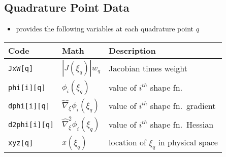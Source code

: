 \subsection*{\libMesh{} Quadrature Point Data}
\begin{frame}[t]
	\begin{block}{}
	\begin{itemize}    
	\item{ \libMesh{} provides the following variables at
	  each quadrature point $q$
	}
	\end{itemize}
	\end{block}
	
	\begin{center}
	  \renewcommand{\arraystretch}{1.3}
	\begin{tabular}{|l|l|l|} \hline
	  \textbf{Code} & \textbf{Math} & \textbf{Description} \\ \hline
	  \texttt{JxW[q]}
	  & $|J(\xi_q)| w_q$
	  & Jacobian times weight
	  \\ \hline
	  \texttt{phi[i][q]}
	  & $\phi_i(\xi_{q})$
	  & value of $i^{th}$ shape fn.\
	  \\ \hline
	  \texttt{dphi[i][q]}
	  & $\hat{\nabla}_{\!\xi} \phi_i (\xi_q)$
	  & value of $i^{th}$ shape fn.\ gradient
	  \\ \hline
	  \texttt{d2phi[i][q]}
	  & $\hat{\nabla}^2_{\!\xi} \phi_i (\xi_q)$
	  & value of $i^{th}$ shape fn.\ Hessian
	  \\ \hline
	  \texttt{xyz[q]}
	  & $x(\xi_q)$
	  & location of $\xi_q$ in physical space
	  \\ \hline
	  \end{tabular}
	\end{center}
	  
\end{frame}
